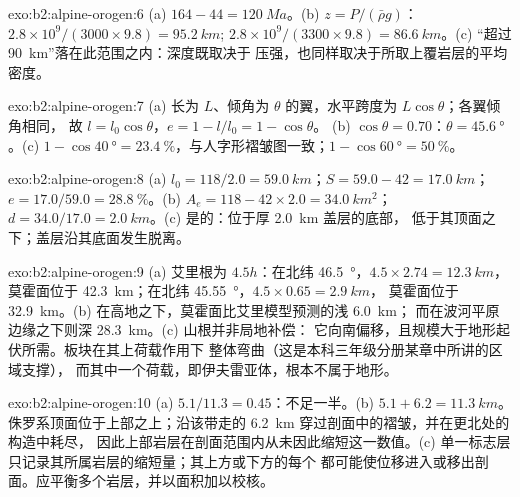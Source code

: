 \begin{solution}{exo:b2:alpine-orogen:6}
(a) $164 - 44 = \qty{120}{Ma}$。(b) $z = P/(\bar\rho g)$：
$2.8\times10^9/(3000\times9.8) = \qty{95.2}{km}$; $2.8\times10^9/(3300\times9.8) =
\qty{86.6}{km}$。(c) “超过 \qty{90}{km}”落在此范围之内：深度既取决于
压强，也同样取决于所取上覆岩层的平均密度。
\end{solution}

\begin{solution}{exo:b2:alpine-orogen:7}
(a) 长为 $L$、倾角为 $\theta$ 的翼，水平跨度为 $L\cos\theta$；各翼倾角相同，
故 $l = l_0\cos\theta$，$e = 1 - l/l_0 = 1 - \cos\theta$。
(b) $\cos\theta = 0.70$：$\theta = \qty{45.6}{\degree}$。(c) $1 - \cos\qty{40}{\degree} =
\qty{23.4}{\percent}$，与人字形褶皱图一致；$1 - \cos\qty{60}{\degree}
= \qty{50}{\percent}$。
\end{solution}

\begin{solution}{exo:b2:alpine-orogen:8}
(a) $l_0 = 118/2.0 = \qty{59.0}{km}$；$S = 59.0 - 42 = \qty{17.0}{km}$；$e = 17.0/59.0 =
\qty{28.8}{\percent}$。(b) $A_e = 118 - 42\times2.0 = \qty{34.0}{km^2}$；$d = 34.0/17.0 =
\qty{2.0}{km}$。(c) 是的：位于厚 \qty{2.0}{km} 盖层的底部，
低于其顶面之下；盖层沿其底面发生脱离。
\end{solution}

\begin{solution}{exo:b2:alpine-orogen:9}
(a) 艾里根为 $4.5h$：在北纬 \qty{46.5}{\degree}，$4.5\times2.74 = \qty{12.3}{km}$，
莫霍面位于 \qty{42.3}{km}；在北纬 \qty{45.55}{\degree}，$4.5\times0.65 = \qty{2.9}{km}$，
莫霍面位于 \qty{32.9}{km}。(b) 在高地之下，莫霍面比艾里模型预测的浅 \qty{6.0}{km}；
而在波河平原边缘之下则深 \qty{28.3}{km}。(c) 山根并非局地补偿：
它向南偏移，且规模大于地形起伏所需。板块在其上荷载作用下
整体弯曲（这是本科三年级分册某章中所讲的区域支撑），
而其中一个荷载，即伊夫雷亚体，根本不属于地形。
\end{solution}

\begin{solution}{exo:b2:alpine-orogen:10}
(a) $5.1/11.3 = 0.45$：不足一半。(b) $5.1 + 6.2 = \qty{11.3}{km}$。
侏罗系顶面位于上部之上；沿该带走的 \qty{6.2}{km}
穿过剖面中的褶皱，并在更北处的构造中耗尽，
因此上部岩层在剖面范围内从未因此缩短这一数值。(c) 单一标志层
只记录其所属岩层的缩短量；其上方或下方的每个
都可能使位移进入或移出剖面。应平衡多个岩层，并以面积加以校核。
\end{solution}

